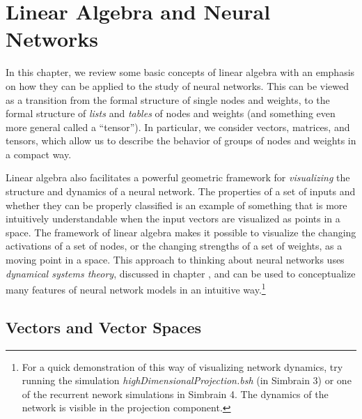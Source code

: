 \chapter{Linear Algebra and Neural Networks}\label{ch_linear_algebra}


In this chapter, we review some basic concepts of linear algebra with an 
emphasis on how they can be applied to the study of neural networks. This can be viewed as a transition from the formal structure of single nodes and weights, to the formal structure of \emph{lists} and \emph{tables} of nodes and weights (and something even more general called a ``tensor''). In particular, we consider vectors, matrices, and tensors, which allow us to describe the behavior of groups of nodes and weights in a compact way.

Linear algebra also facilitates a powerful geometric framework for \emph{visualizing} the structure and dynamics of a neural network. The properties of a set of inputs and whether they can be properly classified is an example of something that is more intuitively understandable when the input vectors are visualized as points in a space. The framework of linear algebra makes it possible to visualize the changing activations of a set of nodes, or the changing strengths of a set of weights, as a moving point in a space. This approach to thinking about neural networks uses \emph{dynamical systems theory}, discussed in chapter , and can be used to conceptualize many features of neural network models in an intuitive way.\footnote{For a quick demonstration of this way of visualizing network dynamics, try running the simulation \emph{highDimensionalProjection.bsh} (in Simbrain 3) or one of the recurrent nework simulations in Simbrain 4. The dynamics of the network is visible in the projection component.}  


\section{Vectors and Vector Spaces}\label{sect_vector}


